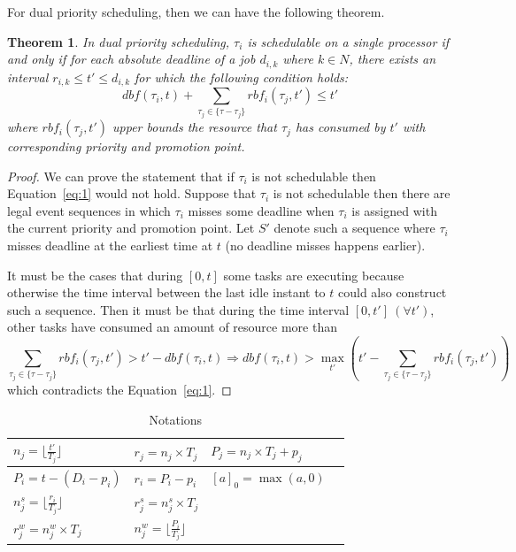 \documentclass[12pt,conference,onecolumn]{IEEEtran}
\newtheorem{theorem}{Theorem}
\newtheorem{proof}{Proof}
\begin{document}
For dual priority scheduling, then we can have the following theorem.
\begin{theorem}
In dual priority scheduling, $\tau_i$ is schedulable on a single processor if and only if for each absolute deadline of a job  $d_{i,k}$ where $k\in N$, there exists an interval $r_{i,k}\leq t'\leq d_{i,k}$ for which the following condition holds:
\begin{equation}
\label{eq:1}
dbf(\tau_i,t)+\sum_{\tau_j\in\{\tau-\tau_j\}}rbf_i(\tau_j,t')\leq t'
\end{equation} 
where $rbf_i(\tau_j,t')$ upper bounds the resource that $\tau_j$ has consumed by $t'$ with corresponding priority and promotion point.
\end{theorem}
\begin{proof}
We can prove the statement that if $\tau_i$ is not schedulable then Equation~\ref{eq:1} would not hold. Suppose that $\tau_i$ is not schedulable then there are legal event sequences in which $\tau_i$ misses some deadline when $\tau_i$ is assigned with the current priority and promotion point. Let $S'$ denote such a sequence where $\tau_i$ misses deadline at the earliest time at $t$ (no deadline misses happens earlier).

It must be the cases that during $[0,t]$ some tasks are executing because otherwise the time interval between the last idle instant to $t$ could also construct such a sequence. Then it must be that during the time interval $[0,t']~(\forall t')$, other tasks have consumed an amount of resource more than 
\[
\sum_{\tau_j\in\{\tau-\tau_j\}}rbf_i(\tau_j,t')>t'-dbf(\tau_i,t)\Rightarrow dbf(\tau_i,t)>\max_{t'}(t'-\sum_{\tau_j\in\{\tau-\tau_j\}}rbf_i(\tau_j,t'))
\]
which contradicts the Equation~\ref{eq:1}.
\end{proof}







 
\begin{table}[h]
\caption{Notations}
\label{tab:x}
\large
\center
\begin{tabular}{|l|l|l|l|}
 \hline
 $n_j=\lfloor \frac{t'}{T_j}\rfloor$ & $r_j=n_j\times T_j$ &$P_j=n_j\times T_j+p_j$ \\
 \hline
$P_i=t-(D_i-p_i)$ & $r_i=P_i-p_i$ &$[a]_0=\max(a,0)$\\
 \hline
$n_j^s=\lfloor \frac{r_i}{T_j}\rfloor$  & $r_j^s=n_j^s\times T_j$& \\
 \hline
 $r_j^w=n_j^w\times T_j$ &	$n_j^w=\lfloor \frac{P_i}{T_j}\rfloor$ &	\\
  \hline
\end{tabular}
\end{table}
\end{document}
